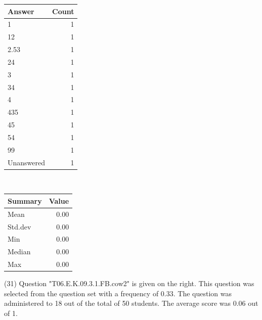 \documentclass[12pt,english,nohyper]{tufte-handout}\usepackage[]{graphicx}\usepackage[]{color}
\begin{document}
\begin{center}%
\begin{tabular}{lr}
  \hline
Answer & Count \\ 
  \hline
1 &   1 \\ 
  12 &   1 \\ 
  2.53 &   1 \\ 
  24 &   1 \\ 
  3 &   1 \\ 
  34 &   1 \\ 
  4 &   1 \\ 
  435 &   1 \\ 
  45 &   1 \\ 
  54 &   1 \\ 
  99 &   1 \\ 
  Unanswered &   1 \\ 
   \hline
\end{tabular}
~~~~~~~~%
\begin{tabular}{lr}
  \hline
Summary & Value \\ 
  \hline
Mean & 0.00 \\ 
  Std.dev & 0.00 \\ 
  Min & 0.00 \\ 
  Median & 0.00 \\ 
  Max & 0.00 \\ 
   \hline
\end{tabular}
\end{center}\newpage{} (31) Question "T06.E.K.09.3.1.FB.cow2" is given on the right. This question was selected from the question set with a frequency of 0.33. The question was administered to 18 out of the total of 50 students. The average score was 0.06 out of 1.
\end{document}
